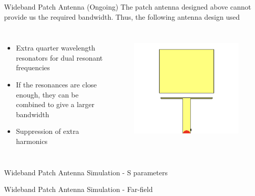 \documentclass{beamer}
\begin{document}
\begin{frame}{Wideband Patch Antenna (Ongoing)}
The patch antenna designed above cannot provide us the required bandwidth. Thus, the following antenna design used\cite{7592896}

\begin{columns}
    \begin{itemize}
        \item Extra quarter wavelength resonators for dual resonant frequencies
        \item If the resonances are close enough, they can be combined to give a larger bandwidth
        \item Suppression of extra harmonics
    \end{itemize}
    \begin{figure}
        \centering
        \includegraphics[width=\textwidth]{images//Antenna/WB_antenna.png}
    \label{fig:enter-label}
\end{figure}
\end{columns}
    
\end{frame}

\begin{frame}{Wideband Patch Antenna Simulation - S parameters}
    
\end{frame}

\begin{frame}{Wideband Patch Antenna Simulation - Far-field}
    
\end{frame}
\end{document}
